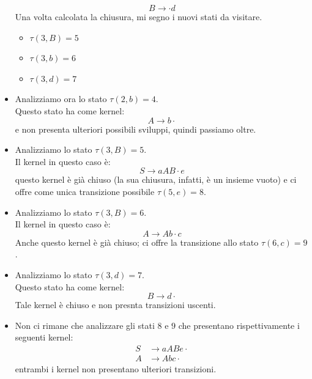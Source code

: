 \documentclass[class=book, crop=false, oneside, 12pt]{standalone}
\begin{document}
\begin{itemize}
\begin{equation*}
        B \to \cdot d
    \end{equation*}
    Una volta calcolata la chiusura, mi segno i nuovi stati da visitare.
    \begin{itemize}
        \item \(\tau (3, B) = 5\)
        \item \(\tau (3, b) = 6\)
        \item \(\tau (3, d) = 7\)
    \end{itemize}
    \item Analizziamo ora lo stato \(\tau (2, b) = 4\). \\
    Questo stato ha come kernel:
    \begin{equation*}
        A \to b \cdot
    \end{equation*}
    e non presenta ulteriori possibili sviluppi, quindi passiamo oltre.
    \item Analizziamo lo stato \(\tau (3, B) = 5\). \\
    Il kernel in questo caso è:
    \begin{equation*}
        S \to aAB \cdot e
    \end{equation*}
    questo kernel è già chiuso (la sua chiusura, infatti, è un insieme vuoto) e ci offre come unica transizione possibile \(\tau (5, e) = 8\).
    \item Analizziamo lo stato \(\tau (3, B) = 6\). \\
    Il kernel in questo caso è:
    \begin{equation*}
        A \to Ab \cdot c
    \end{equation*}
    Anche questo kernel è già chiuso; ci offre la transizione allo stato \(\tau (6, c) = 9\).
    \item Analizziamo lo stato \(\tau (3, d) = 7\). \\
    Questo stato ha come kernel:
    \begin{equation*}
        B \to d \cdot 
    \end{equation*}
    Tale kernel è chiuso e non presnta transizioni uscenti.
    \item Non ci rimane che analizzare gli stati \(8\) e \(9\) che presentano rispettivamente i seguenti kernel:
    \begin{align*}
        S &\to aABe \cdot \\
        A &\to Abc \cdot
    \end{align*}
    entrambi i kernel non presentano ulteriori transizioni.
\end{itemize}
\end{document}
